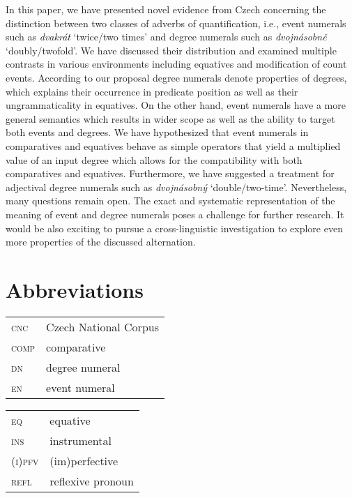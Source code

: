\documentclass[output=paper,
modfonts,
hidelinks,
newtxmath
]{langscibook}
\begin{document}
In this paper, we have presented novel evidence from Czech concerning the distinction between two classes of adverbs of quantification, i.e., event numerals such as \textit{dvakrát} `twice/two times' and degree numerals such as \textit{dvojnásobně} `doubly/twofold'. We have discussed their distribution and examined multiple contrasts in various environments including equatives and modification of count events. According to our proposal degree numerals denote properties of degrees, which explains their occurrence in predicate position as well as their ungrammaticality in equatives. On the other hand, event numerals have a more general semantics which results in wider scope as well as the ability to target both events and degrees. We have hypothesized that event numerals in comparatives and equatives behave as simple operators that yield a multiplied value of an input degree which allows for the compatibility with both comparatives and equatives. Furthermore, we have suggested a treatment for adjectival degree numerals such as \textit{dvojnásobný} `double/two-time'. Nevertheless, many questions remain open. The exact and systematic representation of the meaning of event and degree numerals poses a challenge for further research. It would be also exciting to pursue a cross-linguistic investigation to explore even more properties of the discussed alternation.

\section*{Abbreviations}

\begin{tabularx}{.45\textwidth}{lQ}
\textsc{cnc}&Czech National Corpus\\
\textsc{comp}&comparative\\
\textsc{dn}&degree numeral\\
\textsc{en}&event numeral\\
\end{tabularx}
\begin{tabularx}{.45\textwidth}{lQ}
\textsc{eq}&equative\\
\textsc{ins}&instrumental\\
\textsc{(i)pfv}&(im)perfective\\
\textsc{refl}&reflexive pronoun\\
\end{tabularx}
\end{document}
